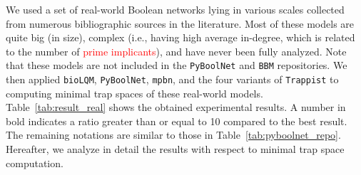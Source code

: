 \documentclass[preprint,12pt]{elsarticle}
\newcommand{\change}[1]{\textcolor{red}{#1}}
\begin{document}
We used a set of real-world Boolean networks lying in various scales collected from numerous bibliographic sources in the literature.
Most of these models are quite big (in size), complex (i.e., having high average in-degree, which is related to the number of \change{prime implicants}), and have never been fully analyzed.
Note that these models are not included in the \texttt{PyBoolNet} and \texttt{BBM} repositories.
We then applied \texttt{bioLQM}, \texttt{PyBoolNet}, \texttt{mpbn}, and the four variants of \texttt{Trappist} to computing minimal trap spaces of these real-world models.
Table~\ref{tab:result_real} shows the obtained experimental results.
A number in bold indicates a ratio greater than or equal to 10 compared to the best result.
The remaining notations are similar to those in Table~\ref{tab:pyboolnet_repo}.
Hereafter, we analyze in detail the results with respect to minimal trap space computation.
\end{document}
